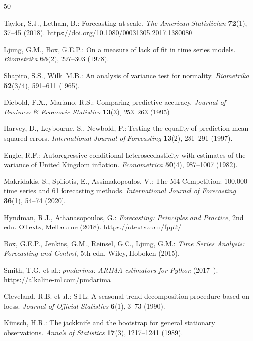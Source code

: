 \documentclass[sn-mathphys-num,pdflatex]{sn-jnl}
\begin{document}
\begin{thebibliography}{50}

Taylor, S.J., Letham, B.:
Forecasting at scale.
\textit{The American Statistician} \textbf{72}(1), 37--45 (2018).
\url{https://doi.org/10.1080/00031305.2017.1380080}

Ljung, G.M., Box, G.E.P.:
On a measure of lack of fit in time series models.
\textit{Biometrika} \textbf{65}(2), 297--303 (1978).

Shapiro, S.S., Wilk, M.B.:
An analysis of variance test for normality.
\textit{Biometrika} \textbf{52}(3/4), 591--611 (1965).

Diebold, F.X., Mariano, R.S.:
Comparing predictive accuracy.
\textit{Journal of Business \& Economic Statistics} \textbf{13}(3),
253--263 (1995).

Harvey, D., Leybourne, S., Newbold, P.:
Testing the equality of prediction mean squared errors.
\textit{International Journal of Forecasting} \textbf{13}(2),
281--291 (1997).

Engle, R.F.:
Autoregressive conditional heteroscedasticity with estimates of the
variance of United Kingdom inflation.
\textit{Econometrica} \textbf{50}(4), 987--1007 (1982).

Makridakis, S., Spiliotis, E., Assimakopoulos, V.:
The M4 Competition: 100{,}000 time series and 61 forecasting methods.
\textit{International Journal of Forecasting} \textbf{36}(1), 54--74 (2020).

Hyndman, R.J., Athanasopoulos, G.:
\textit{Forecasting: Principles and Practice}, 2nd edn.
OTexts, Melbourne (2018).
\url{https://otexts.com/fpp2/}

Box, G.E.P., Jenkins, G.M., Reinsel, G.C., Ljung, G.M.:
\textit{Time Series Analysis: Forecasting and Control}, 5th edn.
Wiley, Hoboken (2015).

Smith, T.G. et al.:
\textit{pmdarima: ARIMA estimators for Python} (2017--).
\url{https://alkaline-ml.com/pmdarima}

Cleveland, R.B. et al.:
STL: A seasonal-trend decomposition procedure based on loess.
\textit{Journal of Official Statistics} \textbf{6}(1), 3--73 (1990).

K\"{u}nsch, H.R.:
The jackknife and the bootstrap for general stationary observations.
\textit{Annals of Statistics} \textbf{17}(3), 1217--1241 (1989).


\end{thebibliography}
\end{document}
